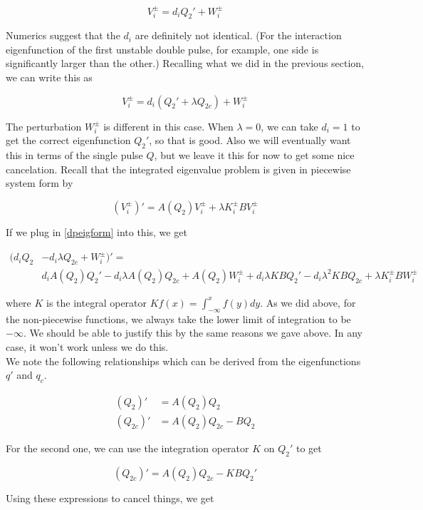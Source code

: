 \documentclass[12pt]{article}
\begin{document}
\[
V_i^\pm = d_i Q_2' + W_i^\pm 
\]

Numerics suggest that the $d_i$ are definitely not identical. (For the interaction eigenfunction of the first unstable double pulse, for example, one side is significantly larger than the other.) Recalling what we did in the previous section, we can write this as

\begin{equation}\label{dpeigform}
V_i^\pm = d_i( Q_2' + \lambda Q_{2c} ) + W_i^\pm
\end{equation}

The perturbation $W_i^\pm$ is different in this case. When $\lambda = 0$, we can take $d_i = 1$ to get the correct eigenfunction $Q_2'$, so that is good. Also we will eventually want this in terms of the single pulse $Q$, but we leave it this for now to get some nice cancelation. Recall that the integrated eigenvalue problem is given in piecewise system form by

\[
(V_i^\pm)' = A(Q_2)V_i^\pm + \lambda K_i^\pm B V_i^\pm
\]

If we plug in \eqref{dpeigform} into this, we get 

\begin{align*}
(d_i Q_2 &- d_i \lambda Q_{2c} + W_i^\pm)' = \\
&d_i A(Q_2)Q_2' - d_i \lambda A(Q_2)Q_{2c} + A(Q_2) W_i^\pm + d_i \lambda KBQ_2' - d_i \lambda^2 KBQ_{2c} + \lambda K_i^\pm B W_i^\pm 
\end{align*}

where $K$ is the integral operator $Kf(x) = \int_{-\infty}^x f(y) dy$. As we did above, for the non-piecewise functions, we always take the lower limit of integration to be $-\infty$. We should be able to justify this by the same reasons we gave above. In any case, it won't work unless we do this.\\

We note the following relationships which can be derived from the eigenfunctions $q'$ and $q_c$.

\begin{align*}
(Q_2)' &= A(Q_2)Q_2 \\
(Q_{2c})' &= A(Q_{2})Q_{2c} - BQ_2  
\end{align*} 

For the second one, we can use the integration operator $K$ on $Q_2'$ to get

\[
(Q_{2c})' = A(Q_{2})Q_{2c} - KBQ_2'
\]

Using these expressions to cancel things, we get
\end{document}
